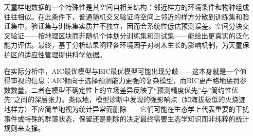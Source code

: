 \documentclass[
  twoside,12pt,fontset=none]{ctexbook}
\begin{document}
天童样地数据的一个特殊性是其空间自相关结构：邻近样方的环境条件和物种组成往往相似。在此条件下，普通随机交叉验证将空间上邻近的样方分散到训练集和验证集中，验证集与训练集实质并不独立，因而会系统性低估预测误差。空间分块交叉验证------按地理区块而非随机个体划分训练集和测试集------能给出更真实的泛化能力评估。最终，基于分析结果阐释各环境因子对树木生长的影响机制，为天童保护区的适应性管理提供科学依据。

在实际分析中，AIC最优模型与BIC最优模型可能出现分歧------这本身就是一个值得审视的信息：AIC倾向于选择预测能力更强的复杂模型，而BIC更严格地惩罚参数数量，二者在模型不确定性上的立场差异反映了``预测精度优先''与''简约性优先''之间的深层张力。类似地，模型诊断中发现的强影响点（如海拔极低的火烧迹地样方）不应简单地视为统计异常而删除------它们可能在生态学上代表重要的干扰事件或特殊的群落状态，保留还是剔除的决定最终需要生态学知识而非纯粹的统计规则来支撑。

  
\end{document}
